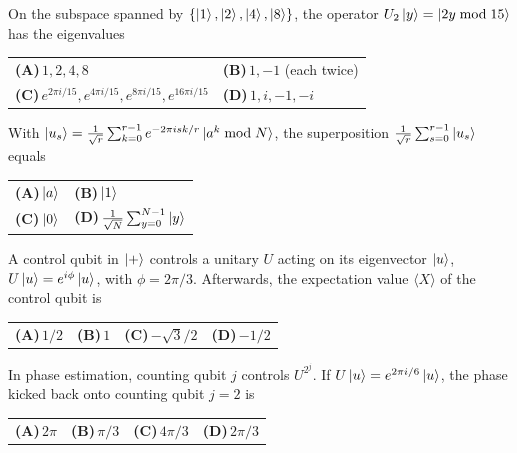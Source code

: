 \documentclass[11pt,a4paper]{article}
\newcommand{\optlabel}[1]{\textbf{(#1)}}
\newenvironment{qitem}[1]{\begin{list}{}{\setlength{\leftmargin}{3.3em}\setlength{\labelwidth}{3.1em}%
  \setlength{\labelsep}{0.2em}\setlength{\topsep}{3pt}\setlength{\parsep}{3pt}}\item[\textbf{Q.#1}\hfill]}{\end{list}}
\newcommand{\qsep}{\par\vspace{2pt}{\color{black!15}\hrule}\vspace{4pt}}
\begin{document}
\begin{qitem}{24}
On the subspace spanned by $\{\ket1, \ket2, \ket4, \ket8\}$, the operator $U_2\ket y = \ket{2y \bmod 15}$ has the eigenvalues
\par\smallskip\noindent\begin{tabularx}{\linewidth}{@{}*{2}{L}@{}}
\optlabel{A}\,$1, 2, 4, 8$ & \optlabel{B}\,$1, -1$ (each twice) \\[3pt]
\optlabel{C}\,$e^{2\pi i/15}, e^{4\pi i/15}, e^{8\pi i/15}, e^{16\pi i/15}$ & \optlabel{D}\,$1, i, -1, -i$
\end{tabularx}
\end{qitem}
\qsep

\begin{qitem}{25}
With $\ket{u_s} = \frac{1}{\sqrt r}\sum_{k=0}^{r-1}e^{-2\pi isk/r}\ket{a^k \bmod N}$, the superposition $\frac{1}{\sqrt r}\sum_{s=0}^{r-1}\ket{u_s}$ equals
\par\smallskip\noindent\begin{tabularx}{\linewidth}{@{}*{2}{L}@{}}
\optlabel{A}\,$\ket a$ & \optlabel{B}\,$\ket1$ \\[3pt]
\optlabel{C}\,$\ket0$ & \optlabel{D}\,$\frac{1}{\sqrt N}\sum_{y=0}^{N-1}\ket y$
\end{tabularx}
\end{qitem}
\qsep

\begin{qitem}{26}
A control qubit in $\ket+$ controls a unitary $U$ acting on its eigenvector $\ket u$, $U\ket u = e^{i\phi}\ket u$, with $\phi = 2\pi/3$. Afterwards, the
expectation value $\langle X\rangle$ of the control qubit is
\par\smallskip\noindent\begin{tabularx}{\linewidth}{@{}*{4}{L}@{}}
\optlabel{A}\,$1/2$ & \optlabel{B}\,$1$ & \optlabel{C}\,$-\sqrt3/2$ & \optlabel{D}\,$-1/2$
\end{tabularx}
\end{qitem}
\qsep

\begin{qitem}{27}
In phase estimation, counting qubit $j$ controls $U^{2^j}$. If $U\ket u = e^{2\pi i/6}\ket u$, the phase kicked back onto counting qubit $j = 2$ is
\par\smallskip\noindent\begin{tabularx}{\linewidth}{@{}*{4}{L}@{}}
\optlabel{A}\,$2\pi$ & \optlabel{B}\,$\pi/3$ & \optlabel{C}\,$4\pi/3$ & \optlabel{D}\,$2\pi/3$
\end{tabularx}
\end{qitem}
\qsep
\end{document}

